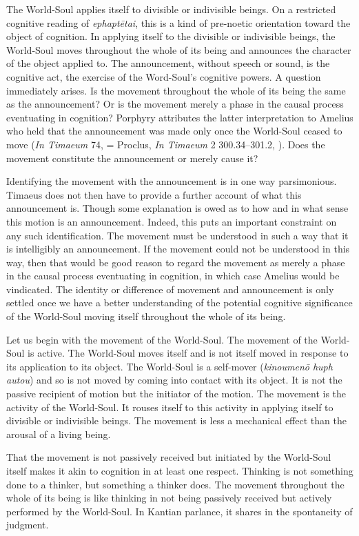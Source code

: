 The World-Soul applies itself to divisible or indivisible beings. On a restricted cognitive reading of \emph{ephaptētai}, this is a kind of pre-noetic orientation toward the object of cognition. In applying itself to the divisible or indivisible beings, the World-Soul moves throughout the whole of its being and announces the character of the object applied to. The announcement, without speech or sound, is the cognitive act, the exercise of the Word-Soul's cognitive powers. A question immediately arises. Is the movement throughout the whole of its being the same as the announcement? Or is the movement merely a phase in the causal process eventuating in cognition? Porphyry attributes the latter interpretation to Amelius who held that the announcement was made only once the World-Soul ceased to move (\emph{In Timaeum} 74, \citealt{Sodano:1964mf} = Proclus, \emph{In Timaeum} 2 300.34--301.2, \citealt{Diehl:1903re}). Does the movement constitute the announcement or merely cause it?

Identifying the movement with the announcement is in one way parsimonious. Timaeus does not then have to provide a further account of what this announcement is. Though some explanation is owed as to how and in what sense this motion is an announcement. Indeed, this puts an important constraint on any such identification. The movement must be understood in such a way that it is intelligibly an announcement. If the movement could not be understood in this way, then that would be good reason to regard the movement as merely a phase in the causal process eventuating in cognition, in which case Amelius would be vindicated. The identity or difference of movement and announcement is only settled once we have a better understanding of the potential cognitive significance of the World-Soul moving itself throughout the whole of its being.

Let us begin with the movement of the World-Soul. The movement of the World-Soul is active. The World-Soul moves itself and is not itself moved in response to its application to its object. The World-Soul is a self-mover (\emph{kinoumenō huph autou}) and so is not moved by coming into contact with its object. It is not the passive recipient of motion but the initiator of the motion. The movement is the activity of the World-Soul. It rouses itself to this activity in applying itself to divisible or indivisible beings. The movement is less a mechanical effect than the arousal of a living being.

That the movement is not passively received but initiated by the World-Soul itself makes it akin to cognition in at least one respect. Thinking is not something done to a thinker, but something a thinker does. The movement throughout the whole of its being is like thinking in not being passively received but actively performed by the World-Soul. In Kantian parlance, it shares in the spontaneity of judgment.


